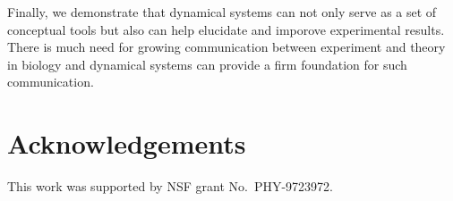 \documentclass[letterpaper]{article}
\begin{document}
Finally, we demonstrate that dynamical systems can not only serve as a set of conceptual
tools but also can help elucidate and imporove experimental results. There is much need
for growing communication between experiment and theory in biology and dynamical systems
can provide a firm foundation for such communication.
\section{Acknowledgements}

This work was supported by NSF grant No.\ PHY-9723972.

\footnotesize

\end{document}
